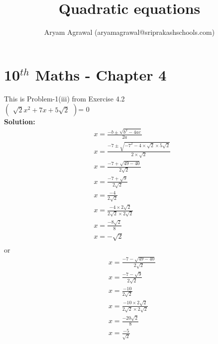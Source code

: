 \documentclass[12pt]{article}
\title{Quadratic equations}
\author{Aryam Agrawal (aryamagrawal@sriprakashschools.com)}
\newcommand{\myvec}[1]{\ensuremath{\begin{pmatrix}#1\end{pmatrix}}}
\newcommand{\solution}{\noindent \textbf{Solution: }}
\begin{document}
\section*{10$^{th}$ Maths - Chapter 4} 
This is Problem-1(iii) from Exercise 4.2\\
\myvec{{\sqrt{2}}x^2+{7} x +{5\sqrt{2}} }= 0\\

\solution\\
\begin{align}
&x=\frac{-b\pm\sqrt{b^2-4ac}}{2a}\\
&x=\frac{-7\pm\sqrt{-7^2-4 \times \sqrt{2}\times5\sqrt{2}}}{2 \times \sqrt{2}}\\
&x=\frac{-7+\sqrt{49-40}}{2\sqrt{2}}\\
&x=\frac{-7+\sqrt{9}}{2\sqrt{2}}\\
&x=\frac{-4}{2\sqrt{2}}\\
&x=\frac{-4\times 2\sqrt{2}}{2\sqrt{2}\times2\sqrt{2}}\\
&x=\frac{-8\sqrt{2}}{8}\\
&x=-\sqrt{2}\\
\end{align}
or\\
\begin{align}
&x=\frac{-7-\sqrt{49-40}}{2\sqrt{2}}\\
&x=\frac{-7-\sqrt{9}}{2\sqrt{2}}\\
&x=\frac{-10}{2\sqrt{2}}\\
&x=\frac{-10\times 2\sqrt{2}}{2\sqrt{2}\times2\sqrt{2}}\\
&x=\frac{-20\sqrt{2}}{8}\\
&x=\frac{-5}{\sqrt{2}}
\end{align}
\end{document}
